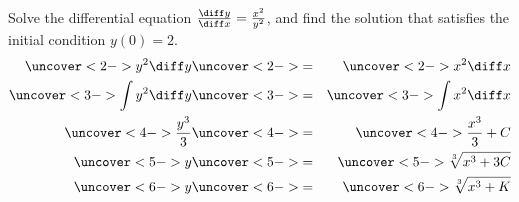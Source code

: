 \begin{frame}
\begin{example} %
Solve the differential equation $\frac{\diff y}{\diff x} = \frac{x^2}{y^2}$, and find the solution that satisfies the initial condition $y(0) = 2$.
\belowdisplayskip=0pt
\begin{eqnarray*}
\uncover<2->{%
y^2 \diff y %
}%
& \uncover<2->{ = } &%
\uncover<2->{%
x^2 \diff x %
}\\%
\uncover<3->{%
\int y^2 \diff y %
}%
& \uncover<3->{ = } &%
\uncover<3->{%
\int x^2 \diff x %
}\\%
\uncover<4->{%
\frac{y^3}{3}%
}%
& \uncover<4->{ = } &%
\uncover<4->{%
\frac{x^3}{3} + C
}\\%
\uncover<5->{%
y%
}%
& \uncover<5->{ = } &%
\uncover<5->{%
\sqrt[3]{x^3 + 3C}%
}\\%
\uncover<6->{%
y%
}%
& \uncover<6->{ = } &%
\uncover<6->{%
\sqrt[3]{x^3 + K}%
}%
\end{eqnarray*}
%
%
%
\end{example}
\end{frame}
